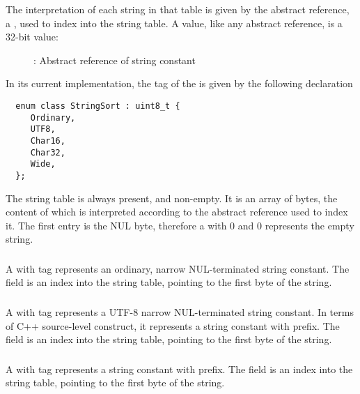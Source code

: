  The interpretation of each
string in that table is given by the abstract reference, a , used to index into
the string table.  A  value, like any abstract reference, is a 32-bit value:
\begin{figure}[H]
  \centering
  \caption{: Abstract reference of string constant}
  \label{fig:ifc-string-index}
\end{figure}

In its current implementation, the tag of the  is given by the following declaration
\begin{lstlisting}
  enum class StringSort : uint8_t {
     Ordinary,
     UTF8,
     Char16,
     Char32,
     Wide,
  };
\end{lstlisting}

The string table is always present, and non-empty.  It is an array of bytes, the content of which is interpreted according to the abstract reference used to index it.
The first entry is the NUL byte, therefore a  with 0  and 0  represents the empty string.


\subsubsection{}
A  with tag   represents an ordinary, narrow NUL-terminated string constant.
The  field is an index into the string table, pointing to the first byte of the string.


\subsubsection{}
A  with tag   represents a UTF-8 narrow NUL-terminated string constant. 
In terms of C++ source-level construct, it represents a string constant with  prefix.
The  field is an index into the string table, pointing to the first byte of the string.

\subsubsection{}
A  with tag   represents a  string constant with  prefix.
The  field is an index into the string table, pointing to the first byte of the string.


